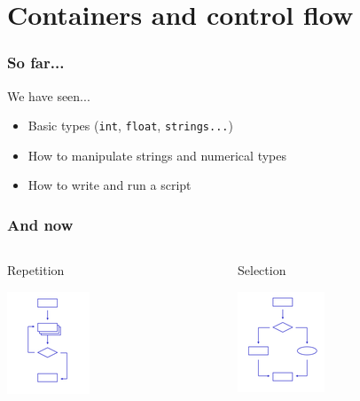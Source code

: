 \documentclass[xcolor=dvipsnames]{beamer}
\begin{document}
\section{Containers and control flow}
\begin{frame}
\frametitle{So far...}
\begin{block}{We have seen...}
\begin{itemize}
\item Basic types (\texttt{int}, \texttt{float}, \texttt{strings...})
\item How to manipulate strings and numerical types
\item How to write and run a script
\end{itemize}
\end{block}
\end{frame}

\begin{frame}
\frametitle{And now}
\begin{columns}

\begin{column}{0.5\textwidth}
\begin{block}{Repetition}
\begin{center}
\includegraphics{images/repetition.png}
\end{center}
\end{block}
\end{column}

\begin{column}{0.5\textwidth}
\begin{block}{Selection}
\begin{center}
\includegraphics{images/selection.png}
\end{center}
\end{block}
\end{column}
\end{columns}
\end{frame}
\end{document}
